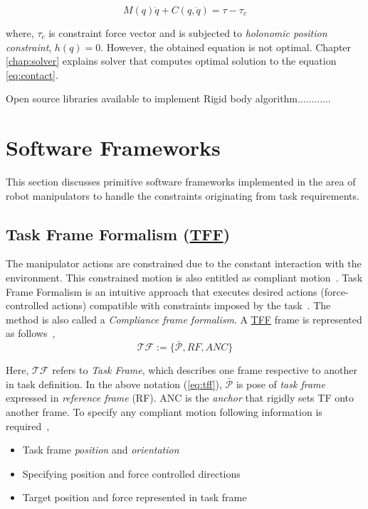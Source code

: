 \begin{equation}\label{eq:contact}
M(q)\ddot{q} + C(q, \ddot{q}) = \tau - \tau_c
\end{equation}

where, $\tau_c$ is constraint force vector and is subjected to \textit{holonomic position constraint}, $h(q) = 0$. However, the obtained equation is not optimal. Chapter \ref{chap:solver} explains solver that computes optimal solution to the equation \ref{eq:contact}.

{\color{red}Open source libraries available to implement Rigid body algorithm............}

%

\section{Software Frameworks}

This section discusses primitive software frameworks implemented in the area of robot manipulators to handle the constraints originating from task requirements. 

\subsection{Task Frame Formalism (\hyperref[tff]{TFF})}
The manipulator actions are constrained due to the constant interaction with the environment. This constrained motion is also entitled as compliant motion~\cite{kroger2004compliant}. Task Frame Formalism is an intuitive approach that executes desired actions (force-controlled actions) compatible with constraints imposed by the task~\cite{bruyninckx1996specification}. The method is also called a \textit{Compliance frame formalism}. A \hyperref[tff]{TFF} frame is represented as follows~\cite{kroger2004compliant},
\begin{equation}\label{eq:tff}
	\mathcal{TF} := \big\{ \bar{\mathcal{P}}, RF, ANC \big\}
\end{equation}

Here, $\mathcal{TF}$ refers to \textit{Task Frame}, which describes one frame respective to another in task definition. In the above notation (\ref{eq:tff}), $\bar{\mathcal{P}}$ is pose of \textit{task frame} expressed in \textit{reference frame} (RF). ANC is the \textit{anchor} that rigidly sets TF onto another frame. To specify any compliant motion following information is required~\cite{de1988compliant},
\begin{itemize}
	\item Task frame \textit{position} and \textit{orientation}
	\item Specifying position and force controlled directions
	\item Target position and force represented in task frame
\end{itemize}

